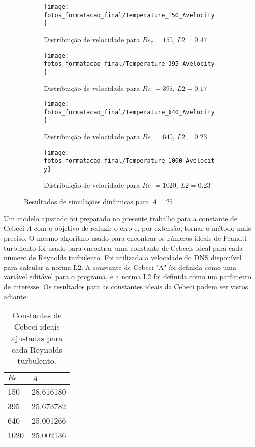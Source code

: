 \begin{figure*}[!h]
	\centering
	\begin{subfigure}[t]{0.5\textwidth}
		\centering
		\texttt{[image: fotos\_formatacao\_final/Temperature\_150\_Avelocity]}
		\caption{Distribuição de velocidade para $Re_\tau = 150$, $L2 = 0.47$}
	\end{subfigure}
	\begin{subfigure}[t]{0.45\textwidth}
		\centering
		\texttt{[image: fotos\_formatacao\_final/Temperature\_395\_Avelocity]}
		\caption{Distribuição de velocidade para $Re_\tau = 395$, $L2 = 0.17$}
	\end{subfigure}
	\begin{subfigure}[t]{0.5\textwidth}
		\centering
		\texttt{[image: fotos\_formatacao\_final/Temperature\_640\_Avelocity]}
		\caption{Distribuição de velocidade para $Re_\tau = 640$, $L2 = 0.23$}
	\end{subfigure}
	\begin{subfigure}[t]{0.45\textwidth}
		\centering
		\texttt{[image: fotos\_formatacao\_final/Temperature\_1000\_Avelocity]}
		\caption{Distribuição de velocidade para $Re_\tau = 1020$, $L2 = 0.23$}
	\end{subfigure}	
	\caption{Resultados de simulações dinâmicas para $A = 26$}
\end{figure*}

Um modelo ajustado foi preparado no presente trabalho para a constante de Cebeci $A$ com o objetivo de reduzir o erro e, por extensão, tornar o método mais preciso. O mesmo algoritmo usado para encontrar os números ideais de Prandtl turbulento foi usado para encontrar uma constante de Cebecis ideal para cada número de Reynolds turbulento. Foi utilizada a velocidade do DNS disponível para calcular a norma L2. A constante de Cebeci "A" foi definida como uma variável editável para o programa, e a norma L2 foi definida como um parâmetro de interesse. Os resultados para as constantes ideais do Cebeci podem ser vistos adiante:


\begin{table}[!h]
	\centering
	\caption{Constantes de Cebeci ideais ajustadas para cada Reynolds turbulento.}
	\begin{tabular}{ll}
		\hline
		$Re_\tau$ & $A$\\
		\hline
		150  &   28.616180\\
		395  &   25.673782\\
		640  &   25.001266\\
		1020 &   25.002136\\ 
		\hline
	\end{tabular}
	\label{tablea}
\end{table}

